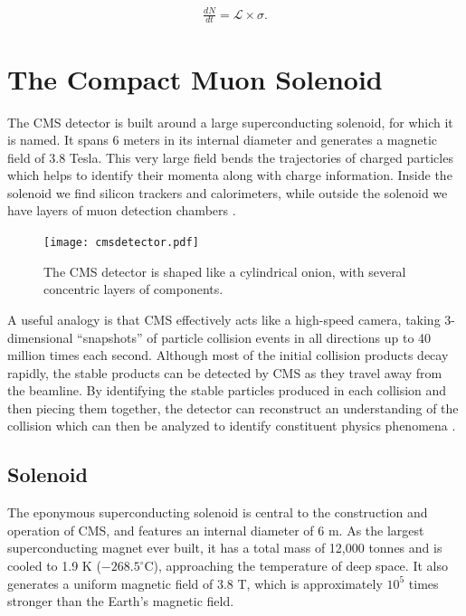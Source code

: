 \begin{equation}
\label{eq:crosssection}
\begin{gathered}
\frac{dN}{dt} = \mathcal{L} \times \sigma.
\end{gathered}
\end{equation}



\section{The Compact Muon Solenoid} \label{chap:chap-3.2-CMS}
The CMS detector is built around a large superconducting solenoid, for which it is named. It spans 6 meters in its internal diameter and generates a magnetic field of 3.8 Tesla. This very large field bends the trajectories of charged particles which helps to identify their momenta along with charge information. Inside the solenoid we find silicon trackers and calorimeters, while outside the solenoid we have layers of muon detection chambers \cite{CMStechprop, The_CMS_Collaboration_2008, Contardo:2020886}.

\begin{figure}[!hbt]
\begin{center}
    \texttt{[image: cmsdetector.pdf]}
    \caption{The CMS detector is shaped like a cylindrical onion, with several concentric layers of components.}
    \label{fig:cmscutaway1}
\end{center}
\end{figure}

A useful analogy is that CMS effectively acts like a high-speed camera, taking 3-dimensional ``snapshots'' of particle collision events in all directions up to 40 million times each second. Although most of the initial collision products decay rapidly, the stable products can be detected by CMS as they travel away from the beamline. By identifying the stable particles produced in each collision and then piecing them together, the detector can reconstruct an understanding of the collision which can then be analyzed to identify constituent physics phenomena \cite{Karimaki:368412, CERN-LHCC-2000-016, Chatrchyan:1129810, Collaboration:2745805, CERN-LHCC-2017-009}.

\subsection{Solenoid}
The eponymous superconducting solenoid is central to the construction and operation of CMS, and features an internal diameter of 6 m. As the largest superconducting magnet ever built, it has a total mass of 12,000 tonnes and is cooled to 1.9 K ($-268.5^\circ$C), approaching the temperature of deep space. It also generates a uniform magnetic field of 3.8 T, which is approximately $10^5$ times stronger than the Earth's magnetic field.

